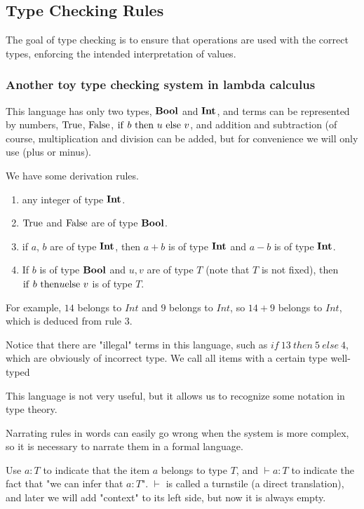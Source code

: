 \documentclass[a4paper]{exam}
\begin{document}
\subsection{Type Checking Rules}
The goal of type checking is to ensure that operations are used with the correct types, enforcing the intended interpretation of values.

\subsubsection{Another toy type checking system in lambda calculus}

This language has only two types, ${\bf Bool}$ and ${\bf Int}$, and terms can be represented by numbers, ${\rm True}$, ${\rm False}$, ${\rm if}\ b\ {\rm then}\ u \ {\rm else}\ v$, and addition and subtraction (of course, multiplication and division can be added, but for convenience we will only use (plus or minus).

We have some derivation rules.

\begin{enumerate}
  \item any integer of type ${\bf Int}$.
  \item ${\rm True}$ and ${\rm False}$ are of type ${\bf Bool}$.
  \item if $a$, $b$ are of type ${\bf Int}$, then $a+b$ is of type ${\bf Int}$ and $a-b$ is of type ${\bf Int}$.
  \item If $b$ is of type ${\bf Bool}$ and $u,v$ are of type $T$ (note that $T$ is not fixed), then ${\rm if}\ b\ {\rm then}\\ u {\rm else}\ v$ is of type $T$.
\end{enumerate}

For example, $14$ belongs to ${ Int}$ and $9$ belongs to ${ Int}$, so $14+9$ belongs to ${Int}$, which is deduced from rule 3.

Notice that there are "illegal" terms in this language, such as ${ if}\ 13\ { then}\ 5\ { else}\ 4$, which are obviously of incorrect type. We call all items with a certain type well-typed

This language is not very useful, but it allows us to recognize some notation in type theory.

Narrating rules in words can easily go wrong when the system is more complex, so it is necessary to narrate them in a formal language.

Use $a:T$ to indicate that the item $a$ belongs to type $T$, and $\vdash a:T$ to indicate the fact that "we can infer that $a:T$". $\vdash$ is called a turnstile (a direct translation), and later we will add "context" to its left side, but now it is always empty.
\end{document}
